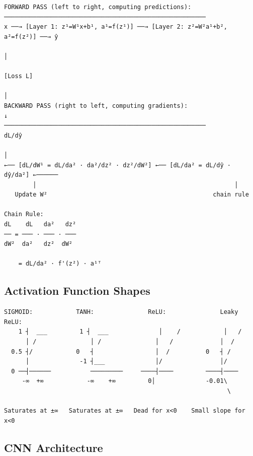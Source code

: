 \documentclass[11pt]{article}
\begin{document}
\begin{verbatim}
FORWARD PASS (left to right, computing predictions):
────────────────────────────────────────────────────────
x ──→ [Layer 1: z¹=W¹x+b¹, a¹=f(z¹)] ──→ [Layer 2: z²=W²a¹+b², a²=f(z²)] ──→ ŷ
                                                                                    │
                                                                                [Loss L]
                                                                                    │
BACKWARD PASS (right to left, computing gradients):                                 ↓
────────────────────────────────────────────────────────                       dL/dŷ
                                                                                    │
←── [dL/dW¹ = dL/da² · da²/dz² · dz²/dW²] ←── [dL/da² = dL/dŷ · dŷ/da²] ←──────
        │                                                       │
   Update W²                                              chain rule
   
Chain Rule:
dL    dL   da²   dz²
── = ─── · ─── · ───
dW²  da²   dz²  dW²

    = dL/da² · f'(z²) · a¹ᵀ
\end{verbatim}

\subsection{Activation Function Shapes}\label{activation-function-shapes}

\setcodelang{}

\begin{verbatim}
SIGMOID:            TANH:               ReLU:               Leaky ReLU:
    1 ┤  ___         1 ┤  ___              │    /            │   /
      │ /               │ /               │   /             │  /
  0.5 ┤/            0   ┤                 │  /          0   ┤ /
      │              -1 ┤___              │/                │/
  0 ──┤──────           ─────────     ────┤────         ────┤────
     -∞  +∞            -∞    +∞         0│              -0.01\
                                                              \

Saturates at ±∞   Saturates at ±∞   Dead for x<0    Small slope for x<0
\end{verbatim}

\subsection{CNN Architecture}\label{cnn-architecture}
\end{document}
